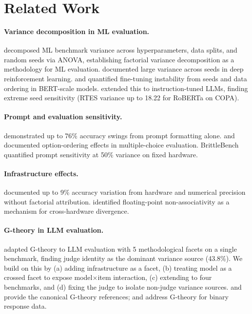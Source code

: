 \documentclass[letterpaper]{article}
\begin{document}
\section{Related Work}

\paragraph{Variance decomposition in ML evaluation.}
\citet{bouthillier2021accounting} decomposed ML benchmark variance across hyperparameters, data splits, and random seeds via ANOVA, establishing factorial variance decomposition as a methodology for ML evaluation.
\citet{henderson2018deep} documented large variance across seeds in deep reinforcement learning.
\citet{dodge2020finetuning} and \citet{sellam2022multberts} quantified fine-tuning instability from seeds and data ordering in BERT-scale models.
\citet{bui2025seed} extended this to instruction-tuned LLMs, finding extreme seed sensitivity (RTES variance up to 18.22 for RoBERTa on COPA).

\paragraph{Prompt and evaluation sensitivity.}
\citet{sclar2024quantifying} demonstrated up to 76\% accuracy swings from prompt formatting alone.
\citet{lu2022fantastically} and \citet{pezeshkpour2024large} documented option-ordering effects in multiple-choice evaluation.
BrittleBench \citep{brittlebench2026} quantified prompt sensitivity at 50\% variance on fixed hardware.

\paragraph{Infrastructure effects.}
\citet{yuan2025precision} documented up to 9\% accuracy variation from hardware and numerical precision without factorial attribution.
\citet{messina2026floating} identified floating-point non-associativity as a mechanism for cross-hardware divergence.

\paragraph{G-theory in LLM evaluation.}
\citet{mesting2026generalizability} adapted G-theory to LLM evaluation with 5 methodological facets on a single benchmark, finding judge identity as the dominant variance source (43.8\%).
We build on this by (a) adding infrastructure as a facet, (b) treating model as a crossed facet to expose model$\times$item interaction, (c) extending to four benchmarks, and (d) fixing the judge to isolate non-judge variance sources.
\citet{shavelson1991generalizability} and \citet{brennan2001generalizability} provide the canonical G-theory references; \citet{jiang2017generalized} and \citet{mushquash2006generalizability} address G-theory for binary response data.
\end{document}
